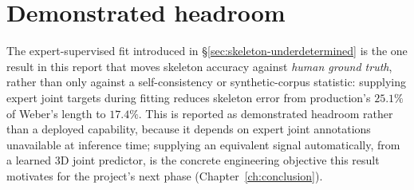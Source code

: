 \section{Demonstrated headroom}
\label{sec:validation-headroom}

The expert-supervised fit introduced in \S\ref{sec:skeleton-underdetermined}
is the one result in this report that moves skeleton accuracy against
\emph{human ground truth}, rather than only against a self-consistency or
synthetic-corpus statistic: supplying expert joint targets during fitting
reduces skeleton error from production's $25.1\%$ of Weber's length to
$17.4\%$. This is reported as demonstrated headroom rather than a deployed
capability, because it depends on expert joint annotations unavailable at
inference time; supplying an equivalent signal automatically, from a learned
3D joint predictor, is the concrete engineering objective this result
motivates for the project's next phase (Chapter~\ref{ch:conclusion}).
